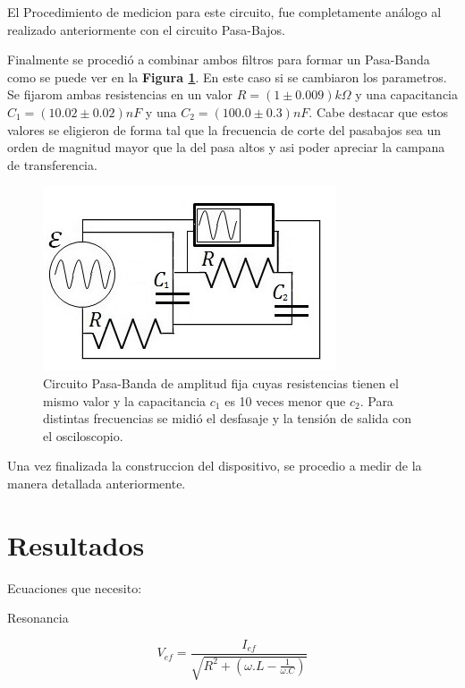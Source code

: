 \documentclass[11pt,a4paper]{article}
\begin{document}
El Procedimiento de medicion para este circuito, fue completamente análogo al realizado anteriormente con el circuito Pasa-Bajos. 

Finalmente se procedió a combinar ambos filtros para formar un Pasa-Banda como se puede ver en la \textbf{Figura \ref{fig:RC-PBD}}. En este caso si se cambiaron los parametros. Se fijarom ambas resistencias en un valor $R = (1 \pm 0.009)k\Omega$ y una capacitancia $C_{1} = (10.02 \pm 0.02)nF$ y una $C_{2} = (100.0 \pm 0.3)nF$. Cabe destacar que estos valores se eligieron de forma tal que la frecuencia de corte del pasabajos sea un orden de magnitud mayor que la del pasa altos y asi poder apreciar la campana de transferencia. 

\begin{figure}[h]
\centering
\includegraphics[scale=0.8]{Circuito-RC-Pasa-Banda}
  \caption{Circuito Pasa-Banda de amplitud fija cuyas resistencias tienen el mismo valor y la capacitancia $c_{1}$ es 10 veces menor que $c_{2}$. Para distintas frecuencias se midió el desfasaje y la tensión de salida con el osciloscopio.}
  \label{fig:RC-PBD}
\end{figure}

Una vez finalizada la construccion del dispositivo, se procedio a medir de la manera detallada anteriormente.



\section{Resultados}
Ecuaciones que necesito:

Resonancia

\begin{equation}
V_{ef} = \frac{I_{ef}}{\sqrt{R^2 + (\omega.L - \frac{1}{\omega.C})}}
\label{eq:1}
\end{equation}
\end{document}
